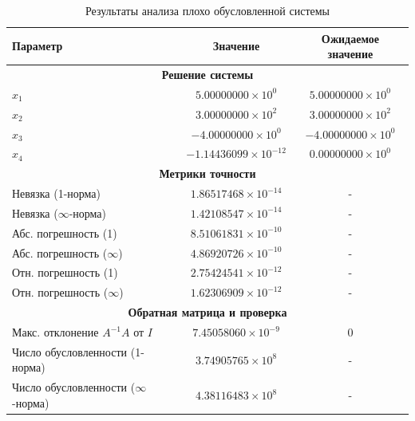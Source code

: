 \documentclass[12pt, a4paper]{article}
\begin{document}
\begin{table}[h]
\centering
\caption{Результаты анализа плохо обусловленной системы}
\begin{tabular}{|l|c|c|}
\hline
\textbf{Параметр} & \textbf{Значение} & \textbf{Ожидаемое значение} \\
\hline
\multicolumn{3}{|c|}{\textbf{Решение системы}} \\
\hline
$x_1$ & $5.00000000 \times 10^0$ & $5.00000000 \times 10^0$ \\
$x_2$ & $3.00000000 \times 10^2$ & $3.00000000 \times 10^2$ \\
$x_3$ & $-4.00000000 \times 10^0$ & $-4.00000000 \times 10^0$ \\
$x_4$ & $-1.14436099 \times 10^{-12}$ & $0.00000000 \times 10^0$ \\
\hline
\multicolumn{3}{|c|}{\textbf{Метрики точности}} \\
\hline
Невязка (1-норма) & $1.86517468 \times 10^{-14}$ & - \\
Невязка ($\infty$-норма) & $1.42108547 \times 10^{-14}$ & - \\
Абс. погрешность (1) & $8.51061831 \times 10^{-10}$ & - \\
Абс. погрешность ($\infty$) & $4.86920726 \times 10^{-10}$ & - \\
Отн. погрешность (1) & $2.75424541 \times 10^{-12}$ & - \\
Отн. погрешность ($\infty$) & $1.62306909 \times 10^{-12}$ & - \\
\hline
\multicolumn{3}{|c|}{\textbf{Обратная матрица и проверка}} \\
\hline
Макс. отклонение $A^{-1}A$ от $I$ & $7.45058060 \times 10^{-9}$ & 0 \\
Число обусловленности (1-норма) & $3.74905765 \times 10^8$ & - \\
Число обусловленности ($\infty$-норма) & $4.38116483 \times 10^8$ & - \\
\hline
\end{tabular}
\end{table}
\end{document}
